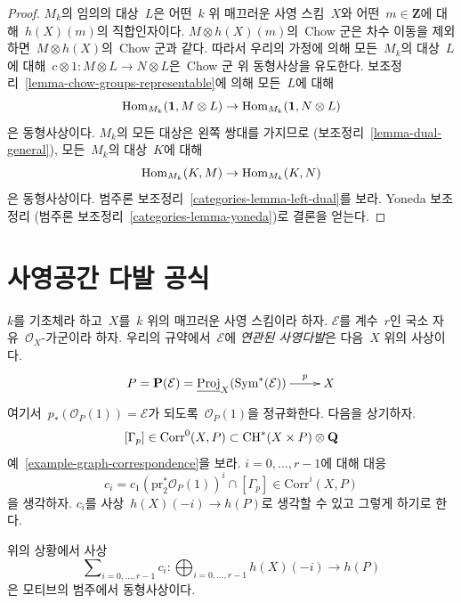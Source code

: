 \begin{proof}
$M_k$의 임의의 대상\  $L$은 어떤\  $k$ 위 매끄러운 사영 스킴\  $X$와
어떤\  $m \in \mathbf{Z}$에 대해\  $h(X)(m)$의 직합인자이다.
$M \otimes h(X)(m)$의\  Chow 군은 차수 이동을 제외하면\ 
$M \otimes h(X)$의\  Chow 군과 같다. 따라서 우리의 가정에 의해
모든\  $M_k$의 대상\  $L$에 대해\ 
$c \otimes 1 : M \otimes L \to N \otimes L$은\  Chow 군 위
동형사상을 유도한다. 보조정리\ 
\ref{lemma-chow-groups-representable}에 의해 모든\  $L$에 대해
$$
\mathop{\mathrm{Hom}}\nolimits_{M_k}(\mathbf{1}, M \otimes L) \to
\mathop{\mathrm{Hom}}\nolimits_{M_k}(\mathbf{1}, N \otimes L)
$$
은 동형사상이다. $M_k$의 모든 대상은 왼쪽 쌍대를 가지므로
(보조정리\  \ref{lemma-dual-general}), 모든\  $M_k$의 대상\  $K$에 대해
$$
\mathop{\mathrm{Hom}}\nolimits_{M_k}(K, M) \to \mathop{\mathrm{Hom}}\nolimits_{M_k}(K, N)
$$
은 동형사상이다. 범주론 보조정리\ 
\ref{categories-lemma-left-dual}를 보라. Yoneda 보조정리
(범주론 보조정리\  \ref{categories-lemma-yoneda})로 결론을 얻는다.
\end{proof}




\section{사영공간 다발 공식}
\label{section-projective-space-bundle}

\noindent
$k$를 기초체라 하고\  $X$를\  $k$ 위의 매끄러운 사영 스킴이라 하자.
$\mathcal{E}$를 계수\  $r$인 국소 자유\  $\mathcal{O}_X$-가군이라 하자.
우리의 규약에서\  $\mathcal{E}$에 {\it 연관된 사영다발}은 다음\  $X$ 위의 사상이다.
$$
\xymatrix{
P = \mathbf{P}(\mathcal{E}) =
\underline{\text{Proj}}_X(\text{Sym}^*(\mathcal{E}))
\ar[r]^-p
& X
}
$$
여기서\  $p_*(\mathcal{O}_P(1)) = \mathcal{E}$가 되도록\ 
$\mathcal{O}_P(1)$을 정규화한다. 다음을 상기하자.
$$
[\Gamma_p] \in \text{Corr}^0(X, P) \subset \mathop{\mathrm{CH}}\nolimits^*(X \times P) \otimes \mathbf{Q}
$$
예\  \ref{example-graph-correspondence}을 보라.
$i = 0, \ldots, r - 1$에 대해 대응
$$
c_i = c_1(\text{pr}_2^*\mathcal{O}_P(1))^i \cap [\Gamma_p]
\in \text{Corr}^i(X, P)
$$
을 생각하자. $c_i$를 사상\  $h(X)(-i) \to h(P)$로 생각할 수 있고
그렇게 하기로 한다.

\begin{lemma}[사영공간 다발 공식]
\label{lemma-projective-space-bundle-formula}
위의 상황에서 사상
$$
\sum\nolimits_{i = 0, \ldots, r - 1} c_i :
\bigoplus\nolimits_{i = 0, \ldots, r - 1} h(X)(-i)
\longrightarrow
h(P)
$$
은 모티브의 범주에서 동형사상이다.
\end{lemma}

